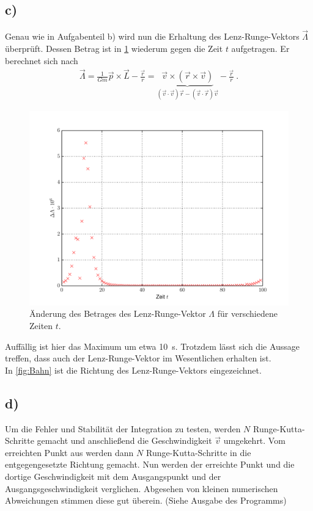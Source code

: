 \subsection*{c)}
Genau wie in Aufgabenteil b) wird nun die Erhaltung des Lenz-Runge-Vektors $\vec{\Lambda}$ überprüft.
Dessen Betrag ist in \cref{fig:LR} wiederum gegen die Zeit $t$ aufgetragen.
Er berechnet sich nach
\begin{align}
\vec{\Lambda}=\frac{1}{Gm}\vec{p}\times\vec{L}-\frac{\vec{r}}{r}
=\underbrace{\vec{v}\times\left(\vec{r}\times\vec{v}\right)}_{(\vec{v}\cdot\vec{v})\vec{r}-(\vec{v}\cdot\vec{r})\vec{v}}-\frac{\vec{r}}{r}~.
\end{align}
\begin{figure}[H]
	\centering
	\includegraphics[width = \textwidth]{../Plots/Plots_4_LR.pdf}
	\caption{Änderung des Betrages des Lenz-Runge-Vektor $\Lambda$ für verschiedene Zeiten $t$.\label{fig:LR}}
\end{figure}
Auffällig ist hier das Maximum um etwa \SI{10}{s}.
Trotzdem lässt sich die Aussage treffen, dass auch der Lenz-Runge-Vektor im Wesentlichen erhalten ist.\\
In \cref{fig:Bahn} ist die Richtung des Lenz-Runge-Vektors eingezeichnet.

\subsection*{d)}
Um die Fehler und Stabilität der Integration zu testen, werden $N$ Runge-Kutta-Schritte gemacht und anschließend die Geschwindigkeit $\vec{v}$ umgekehrt.
Vom erreichten Punkt aus werden dann $N$ Runge-Kutta-Schritte in die entgegengesetzte Richtung gemacht.
Nun werden der erreichte Punkt und die dortige Geschwindigkeit mit dem Ausgangspunkt und der Ausgangsgeschwindigkeit verglichen.
Abgesehen von kleinen numerischen Abweichungen stimmen diese gut überein.
(Siehe Ausgabe des Programms)

